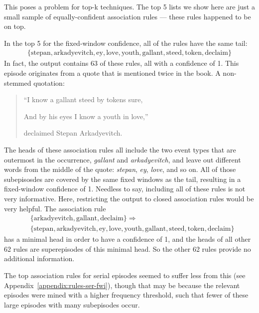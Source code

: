 This poses a problem for top-k techniques. The top 5 lists we show here are just a small sample of equally-confident association rules --- these rules happened to be on top.

In the top 5 for the fixed-window confidence, all of the rules have the same tail:
\begin{align*}
\{ \text{stepan},\allowbreak\text{arkadyevitch},\allowbreak\text{ey},\allowbreak\text{love},\allowbreak\text{youth},\allowbreak\text{gallant},\allowbreak\text{steed},\allowbreak\text{token},\allowbreak\text{declaim} \}
\end{align*}
In fact, the output contains 63 of these rules, all with a confidence of 1. This episode originates from a quote that is mentioned twice in the book. A non-stemmed quotation:
\begin{quotation}
``I know a gallant steed by tokens sure,

And by his eyes I know a youth in love,''

declaimed Stepan Arkadyevitch.
\end{quotation}
The heads of these association rules all include the two event types that are outermost in the occurrence, \emph{gallant} and \emph{arkadyevitch}, and leave out different words from the middle of the quote: \emph{stepan}, \emph{ey}, \emph{love}, and so on. All of those subepisosdes are covered by the same fixed windows as the tail, resulting in a fixed-window confidence of 1. Needless to say, including all of these rules is not very informative. Here, restricting the output to closed association rules would be very helpful. The association rule
\begin{align*}
& \{ \text{arkadyevitch},\allowbreak\text{gallant},\allowbreak\text{declaim} \} \Rightarrow \\
& \{ \text{stepan},\allowbreak\text{arkadyevitch},\allowbreak\text{ey},\allowbreak\text{love},\allowbreak\text{youth},\allowbreak\text{gallant},\allowbreak\text{steed},\allowbreak\text{token},\allowbreak\text{declaim} \}
\end{align*}
has a minimal head in order to have a confidence of 1, and the heads of all other 62 rules are superepisodes of this minimal head. So the other 62 rules provide no additional information.

The top association rules for serial episodes seemed to suffer less from this (see Appendix~\ref{appendix:rules-ser-fwi}), though that may be because the relevant episodes were mined with a higher frequency threshold, such that fewer of these large episodes with many subepisodes occur.

